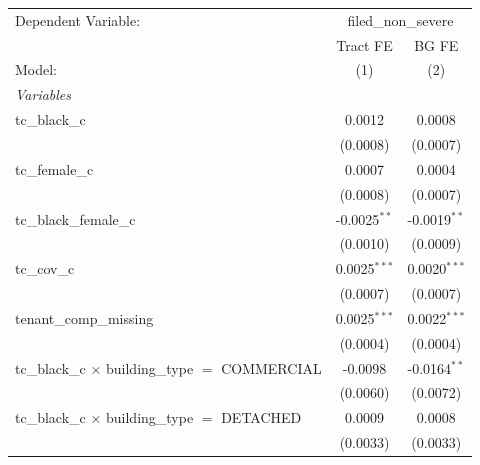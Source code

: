 \begin{tabular}{lcc}
   \tabularnewline \midrule \midrule
   Dependent Variable: & \multicolumn{2}{c}{filed\_non\_severe}\\
                                                                       & Tract FE              & BG FE \\   
   Model:                                                              & (1)                   & (2)\\  
   \midrule
   \emph{Variables}\\
   tc\_black\_c                                                        & 0.0012                & 0.0008\\   
                                                                       & (0.0008)              & (0.0007)\\   
   tc\_female\_c                                                       & 0.0007                & 0.0004\\   
                                                                       & (0.0008)              & (0.0007)\\   
   tc\_black\_female\_c                                                & -0.0025$^{**}$        & -0.0019$^{**}$\\   
                                                                       & (0.0010)              & (0.0009)\\   
   tc\_cov\_c                                                          & 0.0025$^{***}$        & 0.0020$^{***}$\\   
                                                                       & (0.0007)              & (0.0007)\\   
   tenant\_comp\_missing                                               & 0.0025$^{***}$        & 0.0022$^{***}$\\   
                                                                       & (0.0004)              & (0.0004)\\   
   tc\_black\_c $\times$ building\_type $=$ COMMERCIAL                 & -0.0098               & -0.0164$^{**}$\\   
                                                                       & (0.0060)              & (0.0072)\\   
   tc\_black\_c $\times$ building\_type $=$ DETACHED                   & 0.0009                & 0.0008\\   
                                                                       & (0.0033)              & (0.0033)\\   

\end{tabular}
